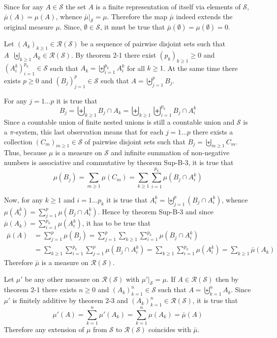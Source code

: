 \documentclass[a4paper]{article}
\newcommand{\brac}[1]{\left ( #1 \right )}
\newcommand{\induc}[1]{\left . #1 \right \vert}
\newcommand{\Scal}{\mathcal{S}}
\newcommand{\Ring}[1]{\mathcal{R}\brac{#1}}
\newcommand{\defn}{\mathop{\overset{\Delta}{=}}\nolimits}
\begin{document}
Since for any $A\in \Scal$ the set $A$ is a finite representation of itself via elements of $\Scal$, $\bar{\mu}\brac{A} = \mu\brac{A}$, whence $\induc{\bar{\mu}}_{\Scal} = \mu$. Therefore the map $\bar{\mu}$ indeed extends the original measure $\mu$. Since, $\emptyset\in \Scal$, it must be true that $\bar{\mu}\brac{\emptyset} = \mu\brac{\emptyset}=0$.

Let $\brac{A_k}_{k\geq1}\in \Ring{\Scal}$ be a sequence of pairwise disjoint sets such that $A\defn \biguplus_{k\geq1}A_k \in \Ring{\Scal}$. By theorem 2-1 there exist $\brac{p_k}_{k\geq 1}\geq 0$ and $\brac{A_i^k}_{i=1}^{p_k}\in \Scal$ such that $A_k=\biguplus_{i=1}^{p_k} A_i^k$ for all $k\geq1$. At the same time there exists $p\geq0$ and $\brac{B_j}_{j=1}^p\in\Scal$ such that $A=\biguplus_{j=1}^p B_j$.

For any $j=1\ldots p$ it is true that \[B_j = \biguplus_{k\geq1} B_j\cap A_k = \biguplus_{k\geq1} \biguplus_{i=1}^{p_k} B_j\cap A_i^k\] Since a countable union of finite nested unions is still a countable union and $\Scal$ is a $\pi$-system, this last observation means that for each $j=1\ldots p$ there exists a collection $\brac{C_m}_{m\geq1}\in\Scal$ of pairwise disjoint sets such that $B_j = \biguplus_{m\geq1} C_m$. Thus, because $\mu$ is a measure on $\Scal$ and infinite summation of non-negative numbers is associative and commutative by theorem Sup-B-3, it is true that \[\mu\brac{B_j} = \sum_{m\geq1} \mu\brac{C_m} = \sum_{k\geq1} \sum_{i=1}^{p_k} \mu\brac{B_j\cap A_i^k}\]

Now, for any $k\geq1$ and $i=1\ldots p_k$ it is true that $A_i^k = \biguplus_{j=1}^p \brac{B_j\cap A_i^k}$, whence $\mu\brac{A_i^k} = \sum_{j=1}^p \mu\brac{B_j\cap A_i^k}$. Hence by theorem Sup-B-3 and since $\bar{\mu}\brac{A_k} = \sum_{i=1}^{p_k} \mu\brac{A_i^k}$, it has to be true that \begin{align*}\bar{\mu}\brac{A} &= \sum_{j=1}^p \mu\brac{B_j} = \sum_{j=1}^p \sum_{k\geq1} \sum_{i=1}^{p_k} \mu\brac{B_j\cap A_i^k} \\&= \sum_{k\geq1} \sum_{i=1}^{p_k} \sum_{j=1}^p \mu\brac{B_j\cap A_i^k} = \sum_{k\geq1} \sum_{i=1}^{p_k} \mu\brac{A_i^k} = \sum_{k\geq1} \bar{\mu}\brac{A_k}\end{align*} Therefore $\bar{\mu}$ is a measure on $\Ring{\Scal}$.

Let $\mu'$ be any other measure on $\Ring{\Scal}$ with $\induc{\mu'}_{\Scal}=\mu$. If $A\in \Ring{\Scal}$ then by theorem 2-1 there exists $n\geq0$ and $\brac{A_k}_{k=1}^n\in \Scal$ such that $A=\biguplus_{k=1}^n A_k$. Since $\mu'$ is finitely additive by theorem 2-3 and $\brac{A_k}_{k=1}^n\in \Ring{\Scal}$, it is true that \[\mu'\brac{A} = \sum_{k=1}^n \mu'\brac{A_k} = \sum_{k=1}^n \mu\brac{A_k} = \bar{\mu}\brac{A}\] Therefore any extension of $\mu$ from $\Scal$ to $\Ring{\Scal}$ coincides with $\bar{\mu}$.\\
\end{document}
